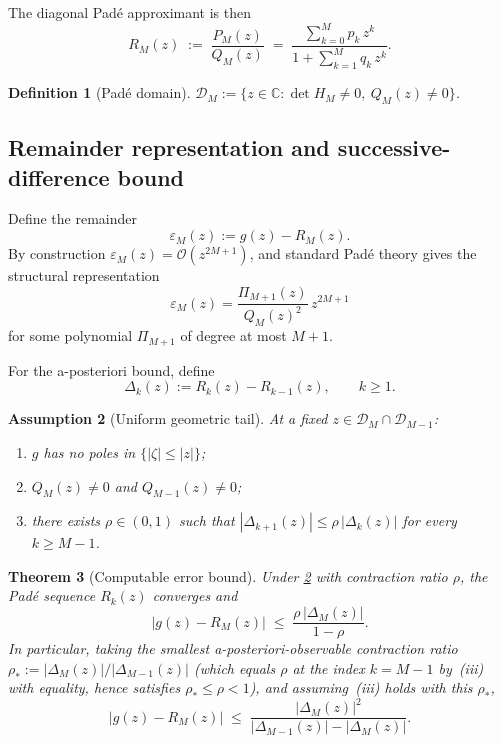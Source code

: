 \documentclass[11pt,a4paper]{article}
\newtheorem{theorem}{Theorem}[section]
\newtheorem{definition}[theorem]{Definition}
\newtheorem{assumption}[theorem]{Assumption}
\newcommand{\C}{\mathbb{C}}
\begin{document}
The diagonal Pad\'e approximant is then
\begin{equation}\label{eq:R_M_def}
R_M(z)\;:=\;\frac{P_M(z)}{Q_M(z)}
\;=\;\frac{\sum_{k=0}^{M}p_k\,z^k}{1+\sum_{k=1}^{M}q_k\,z^k}.
\end{equation}

\begin{definition}[Pad\'e domain]\label{def:D_M}
\(\mathcal{D}_M:=\{z\in\C:\det H_M\neq0,\ Q_M(z)\neq0\}\).
\end{definition}

\subsection{Remainder representation and successive-difference bound}

Define the remainder
\begin{equation}\label{eq:eps_g}
\varepsilon_M(z):=g(z)-R_M(z).
\end{equation}
By construction \(\varepsilon_M(z)=\mathcal{O}(z^{2M+1})\), and standard Pad\'e theory \cite{baker1996} gives the structural representation
\begin{equation}\label{eq:eps_structure}
\varepsilon_M(z)=\frac{\Pi_{M+1}(z)}{Q_M(z)^2}\,z^{2M+1}
\end{equation}
for some polynomial \(\Pi_{M+1}\) of degree at most \(M+1\).

For the a-posteriori bound, define
\begin{equation}\label{eq:Delta_def}
\Delta_k(z):=R_k(z)-R_{k-1}(z),\qquad k\ge1.
\end{equation}

\begin{assumption}[Uniform geometric tail]\label{ass:diff_bound}
At a fixed \(z\in\mathcal{D}_M\cap\mathcal{D}_{M-1}\):
\begin{enumerate}[label=(\roman*),nosep]
\item \(g\) has no poles in \(\{|\zeta|\le|z|\}\);
\item \(Q_M(z)\ne0\) and \(Q_{M-1}(z)\ne0\);
\item there exists \(\rho\in(0,1)\) such that \(|\Delta_{k+1}(z)|\le\rho\,|\Delta_k(z)|\) for every \(k\ge M-1\).
\end{enumerate}
\end{assumption}

\begin{theorem}[Computable error bound]\label{thm:error}
Under \cref{ass:diff_bound} with contraction ratio \(\rho\), the Pad\'e sequence \(R_k(z)\) converges and
\begin{equation}\label{eq:error_bound_uniform}
|g(z)-R_M(z)|\;\le\;\frac{\rho\,|\Delta_M(z)|}{1-\rho}.
\end{equation}
In particular, taking the smallest a-posteriori-observable contraction ratio \(\rho_*:=|\Delta_M(z)|/|\Delta_{M-1}(z)|\) (which equals \(\rho\) at the index \(k=M-1\) by~(iii) with equality, hence satisfies \(\rho_*\le\rho<1\)), and assuming~(iii) holds with this $\rho_*$,
\begin{equation}\label{eq:error_bound}
|g(z)-R_M(z)|\;\le\;\frac{|\Delta_M(z)|^2}{|\Delta_{M-1}(z)|-|\Delta_M(z)|}.
\end{equation}
\end{theorem}
\end{document}
